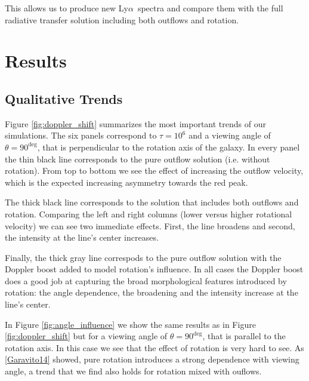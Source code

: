 \documentclass[a4paper,fleqn,usenatbib]{mnras}
\newcommand{\lya}{\ifmmode{{\rm Ly}\alpha}\else Ly$\alpha$\ \fi}
\begin{document}
This allows us to produce new \lya spectra and compare them with the
full radiative transfer solution including both outflows and
rotation.


\section{Results}
\label{sec:results}

\subsection{Qualitative Trends}
\label{sec:qualitative}
Figure \ref{fig:doppler_shift} summarizes the most important trends of
our simulations. 
The six panels correspond to $\tau=10^6$ and a viewing angle of
$\theta =90^{\deg}$, that is perpendicular to the rotation axis of the
galaxy. 
In every panel the thin black line corresponds to the pure outflow
solution (i.e. without rotation). 
From top to bottom we see the effect of increasing the outflow
velocity, which is the expected increasing asymmetry towards the red
peak. 

The thick black line corresponds to the solution that includes both
outflows and rotation.
Comparing the left and right columns (lower versus higher rotational
velocity) we can see two immediate effects.
First, the line broadens and second, the intensity at the line's
center increases.

Finally, the thick gray line correspods to the pure outflow solution
with the Doppler boost added to model rotation's influence.
In all cases the Doppler boost does a good job at capturing the broad
morphological features introduced by rotation: the angle dependence,
the broadening and the intensity increase at the line's center.

In Figure \ref{fig:angle_influence} we show the same results as in
Figure \ref{fig:doppler_shift} but for a viewing angle of $\theta =
90^{\deg}$, that is parallel to the rotation axis. 
In this case we see that the effect of rotation is very hard to see. 
As \ref{Garavito14} showed, pure rotation introduces a strong
dependence with viewing angle, a trend that we find also holds for
rotation mixed with ouflows.  
\end{document}
